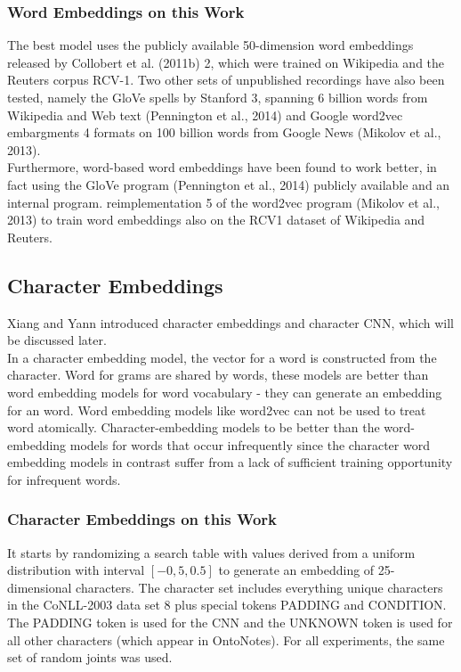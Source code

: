 \documentclass[twocolumn,10pt]{wmrDoc}
\begin{document}
\subsubsection{Word Embeddings on this Work}

The best model uses the publicly available 50-dimension word embeddings released by \cite{DBLP:conf/aaai/BordesWCB11} Collobert
et al. (2011b) 2, which were trained on Wikipedia and the Reuters corpus RCV-1.
Two other sets of unpublished recordings have also been tested, namely the GloVe spells by Stanford 3, spanning 6 billion words from Wikipedia and Web text \cite{DBLP:conf/emnlp/PenningtonSM14}(Pennington et al., 2014) and Google
word2vec embargments 4 formats on 100 billion words from Google News \cite{DBLP:journals/corr/abs-1301-3781}(Mikolov et al., 2013).\\
Furthermore, word-based word embeddings have been found to work better, in fact using the GloVe program (Pennington et al., 2014) publicly available and an internal program.
reimplementation 5 of the word2vec program \cite{DBLP:journals/corr/abs-1301-3781}(Mikolov et al., 2013) to train word embeddings also on the RCV1 dataset of Wikipedia and Reuters.



\subsection{Character Embeddings} 
Xiang and Yann \cite{DBLP:journals/corr/ChiuN15} introduced character embeddings and character CNN, which will be discussed later.\\
In a character embedding model, the vector for a word is constructed from the character.
    Word for grams are shared by words, these models are better than word embedding models for word vocabulary - they can generate an embedding for an word. Word embedding models like word2vec can not be used to treat word atomically.
    Character-embedding models to be better than the word-embedding models for words that occur infrequently since the character word embedding models in contrast suffer from a lack of sufficient training opportunity for infrequent words.


\subsubsection{Character Embeddings on this Work}
It starts by randomizing a search table with values derived from a uniform distribution with interval $[-0,5,0.5]$ to generate an embedding of 25-dimensional characters.
The character set includes everything
unique characters in the \cite{DBLP:journals/corr/cs-CL-0306050}CoNLL-2003 data set 8 plus special tokens
PADDING and CONDITION. The PADDING token is used for the CNN and the UNKNOWN token is used for all other characters (which appear in OntoNotes). For all experiments, the same set of random joints was used.
\end{document}
